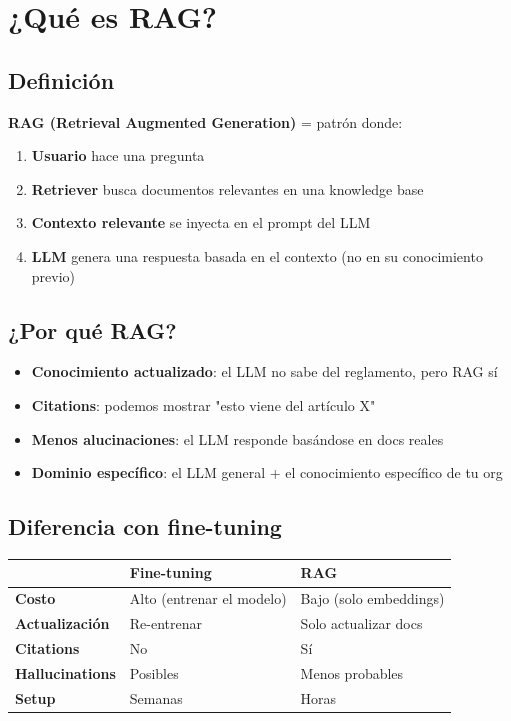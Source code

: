 \documentclass[11pt,a4paper,oneside]{article}
\newcommand{\ok}{\textcolor{okgreen}{\textbf{\checkmark}}}
\begin{document}
\tableofcontents
\newpage

\section{¿Qu\'e es RAG?}

\subsection{Definici\'on}

\textbf{RAG (Retrieval Augmented Generation)} = patr\'on donde:
\begin{enumerate}
  \item \textbf{Usuario} hace una pregunta
  \item \textbf{Retriever} busca documentos relevantes en una knowledge base
  \item \textbf{Contexto relevante} se inyecta en el prompt del LLM
  \item \textbf{LLM} genera una respuesta basada en el contexto (no en su conocimiento previo)
\end{enumerate}

\subsection{¿Por qu\'e RAG?}

\begin{itemize}
  \item \ok \textbf{Conocimiento actualizado}: el LLM no sabe del reglamento, pero RAG s\'i
  \item \ok \textbf{Citations}: podemos mostrar "esto viene del art\'iculo X"
  \item \ok \textbf{Menos alucinaciones}: el LLM responde bas\'andose en docs reales
  \item \ok \textbf{Dominio espec\'ifico}: el LLM general + el conocimiento espec\'ifico de tu org
\end{itemize}

\subsection{Diferencia con fine-tuning}

\begin{center}
\begin{tabular}{lll}
\toprule
& \textbf{Fine-tuning} & \textbf{RAG} \\
\midrule
\textbf{Costo} & Alto (entrenar el modelo) & Bajo (solo embeddings) \\
\textbf{Actualizaci\'on} & Re-entrenar & Solo actualizar docs \\
\textbf{Citations} & No & S\'i \\
\textbf{Hallucinations} & Posibles & Menos probables \\
\textbf{Setup} & Semanas & Horas \\
\bottomrule
\end{tabular}
\end{center}
\end{document}
